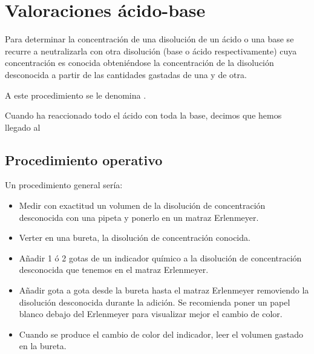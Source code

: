 


\section{Valoraciones ácido-base}\label{sec:valoraciones-acido-base}

Para determinar la concentración de una disolución de un ácido o una base se recurre a neutralizarla con otra disolución (base o ácido respectivamente) cuya concentración es conocida obteniéndose la concentración de la disolución desconocida a partir de las cantidades gastadas de una y de otra.

A este procedimiento se le denomina .

Cuando ha reaccionado todo el ácido con toda la base, decimos que hemos llegado al 

\subsection{Procedimiento operativo}\label{subsec:procedimiento-operativo}

Un procedimiento general sería:
\begin{itemize}
    \item Medir con exactitud un volumen de la disolución de concentración desconocida con una pipeta y ponerlo en un matraz Erlenmeyer.
    \item Verter en una bureta, la disolución de concentración conocida.
    \item Añadir 1 ó 2 gotas de un indicador químico a la disolución de concentración desconocida que tenemos en el matraz Erlenmeyer.
    \item Añadir gota a gota desde la bureta hasta el matraz Erlenmeyer removiendo la disolución desconocida durante la adición.
    Se recomienda poner un papel blanco debajo del Erlenmeyer para visualizar mejor el cambio de color.
    \item Cuando se produce el cambio de color del indicador, leer el volumen gastado en la bureta.
\end{itemize}

